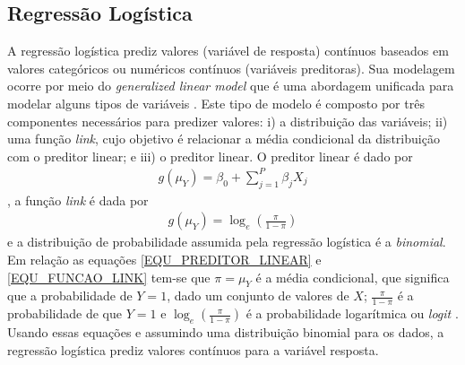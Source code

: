 \subsection{Regressão Logística}
A regressão logística prediz valores (variável de resposta) contínuos baseados em valores categóricos ou numéricos contínuos (variáveis preditoras). Sua modelagem ocorre por meio do \emph{generalized linear model} que é uma abordagem unificada para modelar alguns tipos de variáveis \cite{Agresti2015}. Este tipo de modelo é composto por três componentes necessários \cite{Agresti2015, Olsson2002} para predizer valores: i) a distribuição das variáveis; ii) uma função \emph{link}, cujo objetivo é relacionar a média condicional da distribuição com o preditor linear; e iii) o preditor linear. O preditor linear é dado por
\begin{align}
g(\mu_{Y}) = \beta_{0} + \sum\limits_{j = 1}^{P} \beta_{j}X_{j} \label{EQU_PREDITOR_LINEAR}
\end{align}
, a função \emph{link} é dada por
\begin{align}
g(\mu_{Y}) = \log_{e} \left( \frac{ \pi }{ 1 - \pi } \right)	\label{EQU_FUNCAO_LINK}
\end{align}
e a distribuição de probabilidade assumida pela regressão logística é a \emph{binomial}. Em relação as equações \eqref{EQU_PREDITOR_LINEAR} e \eqref{EQU_FUNCAO_LINK} tem-se que \(\pi = \mu_{Y}\) é a média condicional, que significa que a probabilidade de \(Y = 1\), dado um conjunto de valores de \(X\); \(\frac{\pi}{1 - \pi}\) é a probabilidade de que \(Y = 1\) e \(\log_{e} \left( \frac{\pi}{1-\pi} \right)\) é a probabilidade logarítmica ou \emph{logit} \cite{Olsson2002}. Usando essas equações e assumindo uma distribuição binomial para os dados, a regressão logística prediz valores contínuos para a variável resposta.

